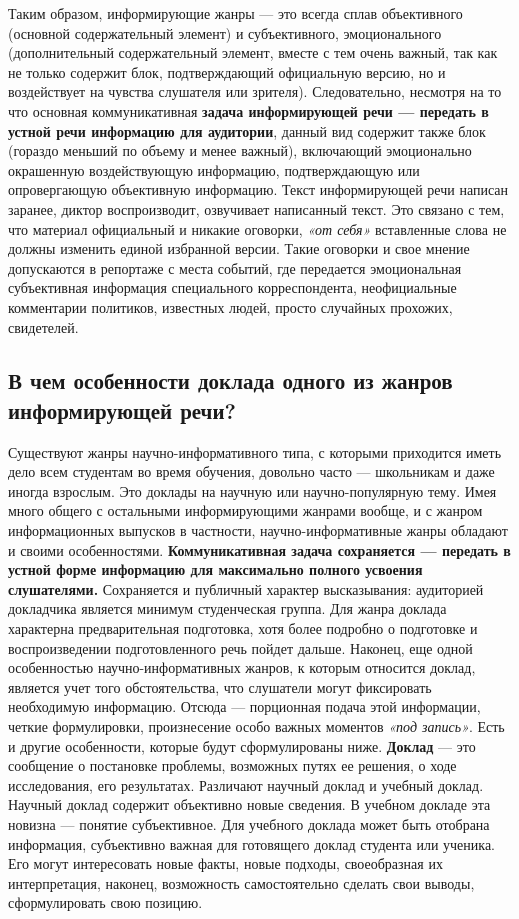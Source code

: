 Таким образом, информирующие жанры — это всегда сплав объективного (основной содержательный элемент) и субъективного, эмоционального (дополнительный содержательный элемент, вместе с тем очень важный, так как не только содержит блок, подтверждающий официальную версию, но и воздействует на чувства слушателя или зрителя). Следовательно, несмотря на то что основная коммуникативная \textbf{задача информирующей речи — передать в устной речи информацию для аудитории}, данный вид содержит также блок (гораздо меньший по объему и менее важный), включающий эмоционально окрашенную воздействующую информацию, подтверждающую или опровергающую объективную информацию. Текст информирующей речи написан заранее, диктор воспроизводит, озвучивает написанный текст. Это связано с тем, что материал официальный и никакие оговорки, \textit{«от себя»} вставленные слова не должны изменить единой избранной версии. Такие оговорки и свое мнение допускаются в репортаже с места событий, где передается эмоциональная субъективная информация специального корреспондента, неофициальные комментарии политиков, известных людей, просто случайных прохожих, свидетелей. 
\subsection*{В чем особенности доклада одного из жанров информирующей речи?}
Существуют жанры научно-информативного типа, с которыми приходится иметь дело всем студентам во время обучения, довольно часто — школьникам и даже иногда взрослым. Это доклады на научную или научно-популярную тему. Имея много общего с остальными информирующими жанрами вообще, и с жанром информационных выпусков в частности, научно-информативные жанры обладают и своими особенностями. \textbf{Коммуникативная задача сохраняется — передать в устной форме информацию для максимально полного усвоения слушателями.} Сохраняется и публичный характер высказывания: аудиторией докладчика является минимум студенческая группа. Для жанра доклада характерна предварительная подготовка, хотя более подробно о подготовке и воспроизведении подготовленного речь пойдет дальше. Наконец, еще одной особенностью научно-информативных жанров, к которым относится доклад, является учет того обстоятельства, что слушатели могут фиксировать необходимую информацию. Отсюда — порционная подача этой информации, четкие формулировки, произнесение особо важных моментов \textit{«под запись»}. Есть и другие особенности, которые будут сформулированы ниже.
\textbf{Доклад }— это сообщение о постановке проблемы, возможных путях ее решения, о ходе исследования, его результатах. Различают научный доклад и учебный доклад. Научный доклад содержит объективно новые сведения. В учебном докладе эта новизна — понятие субъективное. Для учебного доклада может быть отобрана информация, субъективно важная для готовящего доклад студента или ученика. Его могут интересовать новые факты, новые подходы, своеобразная их интерпретация, наконец, возможность самостоятельно сделать свои выводы, сформулировать свою позицию.

